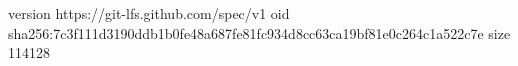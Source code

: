 version https://git-lfs.github.com/spec/v1
oid sha256:7c3f111d3190ddb1b0fe48a687fe81fc934d8cc63ca19bf81e0c264c1a522c7e
size 114128
